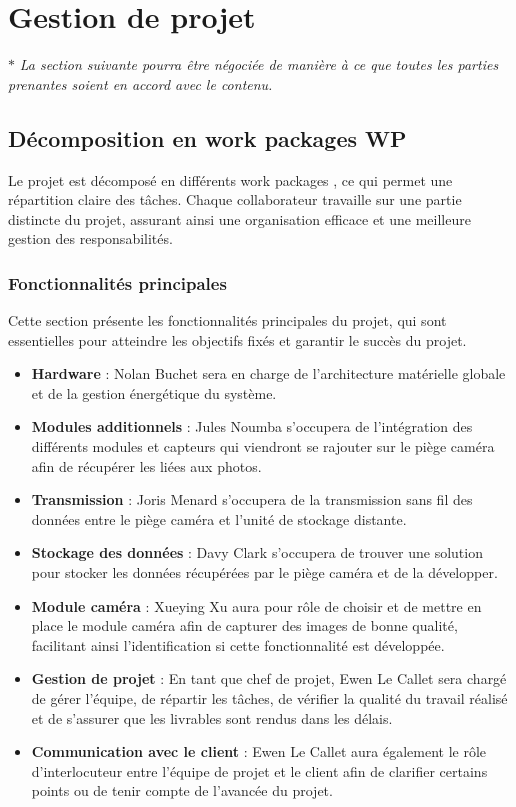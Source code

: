 \section{Gestion de projet}

$ \ast $ \textit{La section suivante pourra être négociée de manière à ce que toutes les parties prenantes soient en accord avec le contenu.}

\subsection{Décomposition en work packages WP}
Le projet est décomposé en différents work packages , ce qui permet une répartition claire des tâches.
Chaque collaborateur travaille sur une partie distincte du projet, assurant ainsi une organisation efficace et une meilleure gestion des responsabilités.

\subsubsection{Fonctionnalités principales}
Cette section présente les fonctionnalités principales du projet, qui sont essentielles pour atteindre les objectifs fixés et garantir le succès du projet. \\
\begin{itemize}
    \item \textbf{Hardware} : Nolan Buchet sera en charge de l’architecture matérielle globale et de la gestion énergétique du système.
    \item \textbf{Modules additionnels} : Jules Noumba s’occupera de l’intégration des différents modules et capteurs qui viendront se rajouter sur le piège caméra afin de récupérer les  liées aux photos.
    \item \textbf{Transmission} : Joris Menard s'occupera de la transmission sans fil des données entre le piège caméra et l'unité de stockage distante.
    \item \textbf{Stockage des données} : Davy Clark s'occupera de trouver une solution pour stocker les données récupérées par le piège caméra et de la développer.
    \item \textbf{Module caméra} : Xueying Xu aura pour rôle de choisir et de mettre en place le module caméra afin de capturer des images de bonne qualité, facilitant ainsi l'identification si cette fonctionnalité est développée.
    \item \textbf{Gestion de projet} : En tant que chef de projet, Ewen Le Callet sera chargé de gérer l'équipe, de répartir les tâches, de vérifier la qualité du travail réalisé et de s'assurer que les livrables sont rendus dans les délais.
    \item \textbf{Communication avec le client} : Ewen Le Callet aura également le rôle d'interlocuteur entre l'équipe de projet et le client afin de clarifier certains points ou de tenir compte de l'avancée du projet.
\end{itemize}

